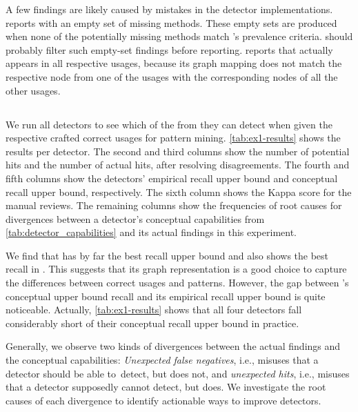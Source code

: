 \vspace{0.03in}
A few findings are likely caused by mistakes in the detector implementations.
\DMMC reports  with an empty set of missing methods.
These empty sets are produced when none of the potentially missing methods match \DMMC's prevalence criteria.
\DMMC should probably filter such empty-set findings before reporting.
%
\GROUMiner reports  that actually appears in all respective usages, because its graph mapping does not match the respective  node from one of the usages with the corresponding nodes of all the other usages.



\subsection{}

We run all detectors to see which of the  from \MUBench they can detect when given the respective crafted correct usages for pattern mining.
\autoref{tab:ex1-results} shows the results per detector.
%
The second and third columns show the number of potential hits and the number of actual hits, after resolving disagreements.
The fourth and fifth columns show the detectors' empirical recall upper bound and conceptual recall upper bound, respectively.
The sixth column shows the Kappa score for the manual reviews.
The remaining columns show the frequencies of root causes for divergences between a detector's conceptual capabilities from \autoref{tab:detector_capabilities} and its actual findings in this experiment.

We find that \GROUMiner has by far the best recall upper bound and also shows the best recall in .
This suggests that its graph representation is a good choice to capture the differences between correct usages and patterns.
However, the gap between \GROUMiner's conceptual upper bound recall and its empirical recall upper bound is quite noticeable.
Actually, \autoref{tab:ex1-results} shows that all four detectors fall considerably short of their conceptual recall upper bound in practice.

Generally, we observe two kinds of divergences between the actual findings and the conceptual capabilities:
\emph{Unexpected false negatives}, i.e., misuses that a detector should be able to~detect, but does not, and \emph{unexpected hits}, i.e., misuses that a detector supposedly cannot detect, but does.
We investigate the root causes of each divergence to identify actionable ways to improve detectors.

